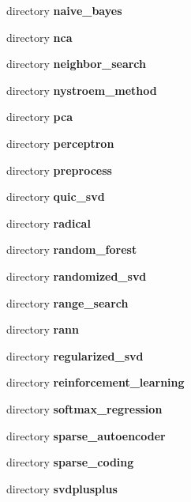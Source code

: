 \begin{DoxyCompactItemize}
directory \textbf{ naive\+\_\+bayes}
\item 
directory \textbf{ nca}
\item 
directory \textbf{ neighbor\+\_\+search}
\item 
directory \textbf{ nystroem\+\_\+method}
\item 
directory \textbf{ pca}
\item 
directory \textbf{ perceptron}
\item 
directory \textbf{ preprocess}
\item 
directory \textbf{ quic\+\_\+svd}
\item 
directory \textbf{ radical}
\item 
directory \textbf{ random\+\_\+forest}
\item 
directory \textbf{ randomized\+\_\+svd}
\item 
directory \textbf{ range\+\_\+search}
\item 
directory \textbf{ rann}
\item 
directory \textbf{ regularized\+\_\+svd}
\item 
directory \textbf{ reinforcement\+\_\+learning}
\item 
directory \textbf{ softmax\+\_\+regression}
\item 
directory \textbf{ sparse\+\_\+autoencoder}
\item 
directory \textbf{ sparse\+\_\+coding}
\item 
directory \textbf{ svdplusplus}
\end{DoxyCompactItemize}

